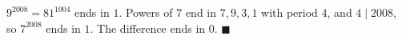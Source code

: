 $9^{2008}=81^{1004}$ ends in $1$. Powers of $7$ end in $7,9,3,1$ with period $4$, and $4\mid2008$, so $7^{2008}$ ends in $1$. The difference ends in $0$. $\blacksquare$
